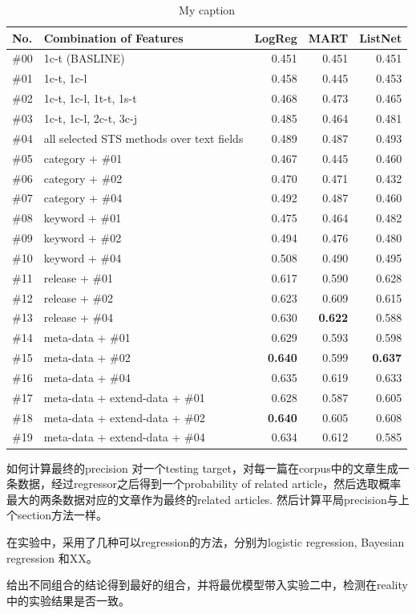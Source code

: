 \begin{table}[]
\centering
\begin{tabular}{llrrr}
\textbf{No.} & \textbf{Combination of Features} & \textbf{LogReg} & \textbf{MART} & \textbf{ListNet} \\ \hline
\#00 & 1c-t (BASLINE) & 0.451 & 0.451 & 0.451 \\ \hline
\#01 & 1c-t, 1c-l & 0.458 & 0.445 & 0.453 \\
\#02 & 1c-t, 1c-l, 1t-t, 1s-t & 0.468 & 0.473 & 0.465 \\
\#03 & 1c-t, 1c-l, 2c-t, 3c-j & 0.485 & 0.464 & 0.481 \\
\#04 & all selected STS methods over text fields & 0.489 & 0.487 & 0.493 \\
\#05 & category + \#01 & 0.467 & 0.445 & 0.460 \\
\#06 & category + \#02 & 0.470 & 0.471 & 0.432 \\
\#07 & category + \#04 & 0.492 & 0.487 & 0.460 \\
\#08 & keyword + \#01 & 0.475 & 0.464 & 0.482 \\
\#09 & keyword + \#02 & 0.494 & 0.476 & 0.480 \\
\#10 & keyword + \#04 & 0.508 & 0.490 & 0.495 \\
\#11 & release + \#01 & 0.617 & 0.590 & 0.628 \\
\#12 & release + \#02 & 0.623 & 0.609 & 0.615 \\
\#13 & release + \#04 & 0.630 & \textbf{0.622} & 0.588 \\
\#14 & meta-data + \#01 & 0.629 & 0.593 & 0.598 \\
\#15 & meta-data + \#02 & \textbf{0.640} & 0.599 & \textbf{0.637} \\
\#16 & meta-data + \#04 & 0.635 & 0.619 & 0.633 \\
\#17 & meta-data + extend-data + \#01 & 0.628 & 0.587 & 0.605 \\
\#18 & meta-data + extend-data + \#02 & \textbf{0.640} & 0.605 & 0.608 \\
\#19 & meta-data + extend-data + \#04 & 0.634 & 0.612 & 0.585 \\ \hline
\end{tabular}
\caption{My caption}
\label{my-label}
\end{table}

如何计算最终的precision
对一个testing target，对每一篇在corpus中的文章生成一条数据，经过regressor之后得到一个probability of related article，然后选取概率最大的两条数据对应的文章作为最终的related articles. 然后计算平局precision与上个section方法一样。

在实验中，采用了几种可以regression的方法，分别为logistic regression, Bayesian regression 和XX。 

给出不同组合的结论得到最好的组合，并将最优模型带入实验二中，检测在reality中的实验结果是否一致。 
